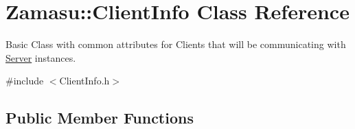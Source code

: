 \hypertarget{class_zamasu_1_1_client_info}{}\section{Zamasu\+:\+:Client\+Info Class Reference}
\label{class_zamasu_1_1_client_info}


Basic Class with common attributes for Clients that will be communicating with \hyperlink{class_zamasu_1_1_server}{Server} instances.  




{\ttfamily \#include $<$Client\+Info.\+h$>$}

\subsection*{Public Member Functions}
